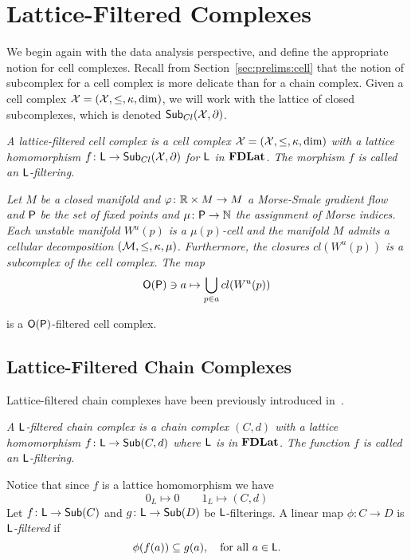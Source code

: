 \section{Lattice-Filtered  Complexes}\label{sec:lfc}


We begin again with the data analysis perspective, and define the appropriate notion for cell complexes.  Recall from Section~\ref{sec:prelims:cell} that the notion of subcomplex for a cell complex is more delicate than for a chain complex.  Given a cell complex ${\mathcal X}=({\mathcal X},\leq,\kappa,\dim)$, we will work with the lattice of closed subcomplexes, which is denoted $\mathsf{Sub}_{Cl}({\mathcal X},\partial)$.

\begin{defn}
{\em
A {\em lattice-filtered cell complex} is a cell complex ${\mathcal X}=({\mathcal X},\leq,\kappa,\dim)$ with a lattice homomorphism $f\colon {\mathsf L}\to \mathsf{Sub}_{Cl}({\mathcal X},\partial)$ for ${\mathsf L}$ in ${\bf FDLat}$.  The morphism $f$ is called an {\em ${\mathsf L}$-filtering}.
}
\end{defn}

\begin{ex}
{\em
Let $M$ be a closed manifold and $\varphi\colon {\mathbb{R}}\times M\to M$ a Morse-Smale gradient flow and ${\mathsf P}$ be the set of fixed points and $\mu\colon {\mathsf P}\to {\mathbb{N}}$ the assignment of Morse indices.  Each unstable manifold $W^u(p)$ is a $\mu(p)$-cell and the manifold $M$ admits a cellular decomposition $({\mathcal M},\leq,\kappa,\mu)$.  Furthermore, the closures $cl(W^u(p))$ is a subcomplex of the cell complex.  The map 
\[
{\mathsf O}({\mathsf P}) \ni a \mapsto \bigcup_{p\in a} cl(W^u(p))
\]

is a ${\mathsf O}({\mathsf P})$-filtered cell complex.
}
\end{ex}

\subsection{Lattice-Filtered Chain Complexes}

Lattice-filtered chain complexes have been previously introduced in~\cite{robbin:salamon2}.  

\begin{defn}
{\em
A {\em ${\mathsf L}$-filtered chain complex} is a chain complex $(C,d)$ with a lattice homomorphism $f\colon {\mathsf L}\to \mathsf{Sub}(C,d)$ where ${\mathsf L}$ is in ${\bf FDLat}$.   The function $f$ is called an {\em ${\mathsf L}$-filtering}.
}
\end{defn}



Notice that since $f$ is a lattice homomorphism we have $$0_L\mapsto 0\quad\quad 1_L \mapsto (C,d)$$  Let $f\colon {\mathsf L} \to \mathsf{Sub}(C)$ and $g\colon {\mathsf L} \to \mathsf{Sub}(D)$ be ${\mathsf L}$-filterings. 
A linear map $\phi\colon C\to D$ is {\em ${\mathsf L}$-filtered} if
\[
\phi(f(a)) \subseteq g(a),\quad\text{for all $a\in{\mathsf L}$}.
\]




